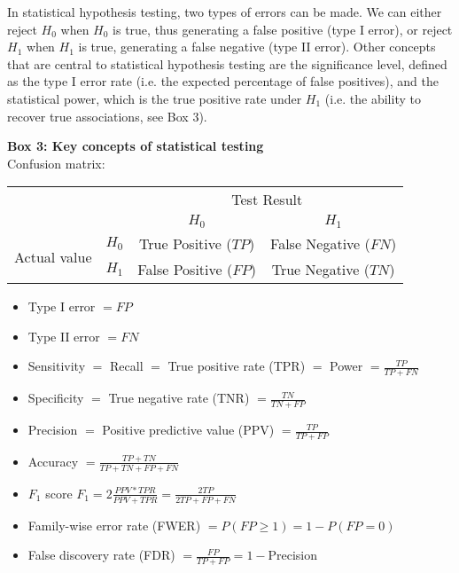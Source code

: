 In statistical hypothesis testing, two types of errors can be made. 
We can either reject $H_0$ when $H_0$ is true, thus generating a false positive (type I error), or reject $H_1$ when $H_1$ is true, generating a false negative (type II error).
Other concepts that are central to statistical hypothesis testing are the significance level, defined as the type I error rate (i.e. the expected percentage of false positives), and the statistical power, which is the true positive rate under $H_1$ (i.e. the ability to recover true associations, see Box 3).


\newpage

\begin{Comment}
\hspace{-2.5mm}\textbf{Box 3: Key concepts of statistical testing}\label{box3}\\
Confusion matrix:

\begin{center}
\begin{tabular}{l|l|c|c|}
\multicolumn{2}{c}{}&\multicolumn{2}{c}{Test Result}\\
\cline{3-4}
\multicolumn{2}{c|}{}&$H_0$&$H_1$\\
\cline{2-4}
\multirow{2}{*}{Actual value}& $H_0$ & True Positive ($TP$) & False Negative ($FN$)\\
\cline{2-4}
& $H_1$ & False Positive ($FP$) & True Negative ($TN$)\\
\cline{2-4}
\end{tabular}
\end{center}

\begin{itemize}
    \item Type I error $= FP$
    \item Type II error $= FN$
    \item Sensitivity $=$ Recall $=$ True positive rate (TPR) $=$ Power $=\frac{TP}{TP+FN}$
    \item Specificity $=$ True negative rate (TNR) $=\frac{TN}{TN+FP}$
    \item Precision $=$ Positive predictive value (PPV) $=\frac{TP}{TP+FP}$
    \item Accuracy $=\frac{TP+TN}{TP+TN+FP+FN}$
    \item $F_1$ score $F_1=2 \frac{PPV*TPR}{PPV+TPR}=\frac{2TP}{2TP+FP+FN}$
    \item Family-wise error rate (FWER) $=P(FP \geq 1)= 1 - P(FP=0)$
    \item False discovery rate (FDR) $=\frac{FP}{TP+FP}= 1- $Precision
\end{itemize}

\vfill

\end{Comment}

